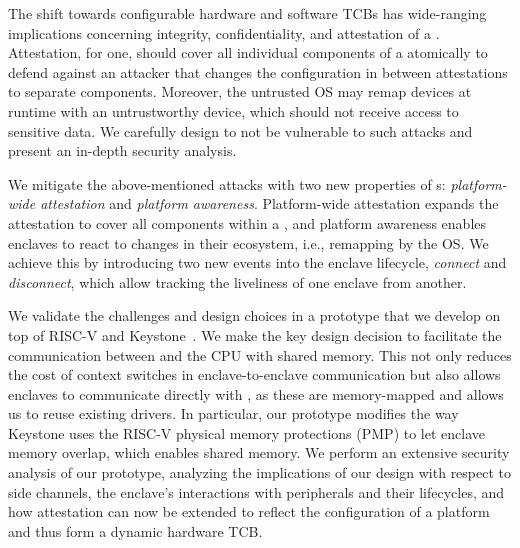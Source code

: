 The shift towards configurable hardware and software TCBs has wide-ranging implications concerning integrity, confidentiality, and attestation of a \nameenclave{}. 
Attestation, for one, should cover all individual components of a \nameenclave{} atomically to defend against an attacker that changes the configuration in between attestations to separate components. 
Moreover, the untrusted OS may remap \sphw devices at runtime with an untrustworthy device, which should not receive access to sensitive data. We carefully design \name{} to not be vulnerable to such attacks and present an in-depth security analysis.

We mitigate the above-mentioned attacks with two new properties of \nameenclave{}s: \emph{platform-wide attestation} and \emph{platform awareness}. Platform-wide attestation expands the attestation to cover all components within a \nameenclave, and platform awareness enables enclaves to react to changes in their ecosystem, i.e., remapping by the OS.
We achieve this by introducing two new events into the enclave lifecycle, \textit{connect} and \textit{disconnect}, which allow tracking the liveliness of one enclave from another.

We validate the challenges and design choices in a prototype that we develop on top of RISC-V and Keystone~\cite{keystone}. We make the key design decision to facilitate the communication between \sphw and the CPU with shared memory. This not only reduces the cost of context switches in enclave-to-enclave communication but also allows enclaves to communicate directly with \sphw, as these are memory-mapped and allows us to reuse existing drivers. In particular, our prototype modifies the way Keystone uses the RISC-V physical memory protections (PMP) to let enclave memory overlap, which enables shared memory. 
We perform an extensive security analysis of our prototype, analyzing the implications of our design with respect to side channels, the enclave's interactions with peripherals and their lifecycles, and how attestation can now be extended to reflect the configuration of a platform and thus form a dynamic hardware TCB. 



